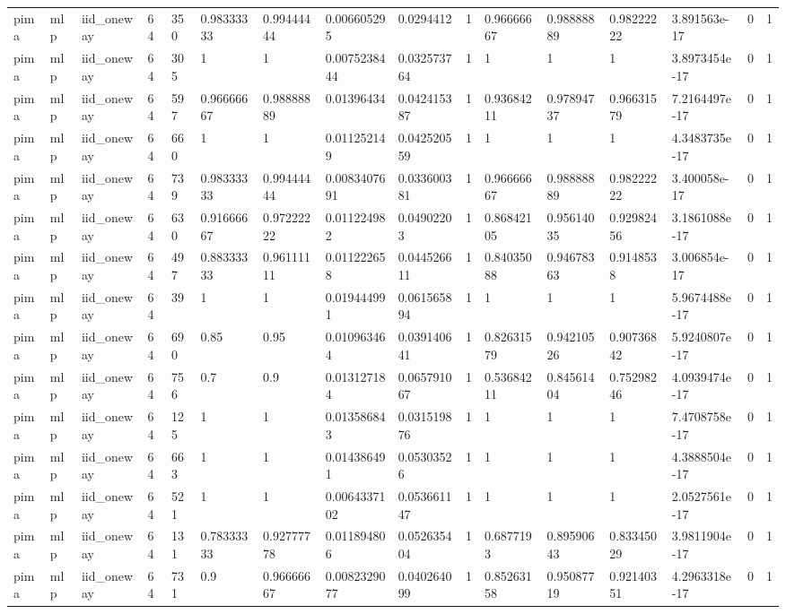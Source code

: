 \begin{tabular}{llllllllllllllll}
pima & mlp & iid\_oneway & 64 & 350 & 0.98333333 & 0.99444444 & 0.006605295 & 0.0294412 & 1 & 0.96666667 & 0.98888889 & 0.98222222 & 3.891563e-17 & 0 & 1 \\
pima & mlp & iid\_oneway & 64 & 305 & 1 & 1 & 0.0075238444 & 0.032573764 & 1 & 1 & 1 & 1 & 3.8973454e-17 & 0 & 1 \\
pima & mlp & iid\_oneway & 64 & 597 & 0.96666667 & 0.98888889 & 0.01396434 & 0.042415387 & 1 & 0.93684211 & 0.97894737 & 0.96631579 & 7.2164497e-17 & 0 & 1 \\
pima & mlp & iid\_oneway & 64 & 660 & 1 & 1 & 0.011252149 & 0.042520559 & 1 & 1 & 1 & 1 & 4.3483735e-17 & 0 & 1 \\
pima & mlp & iid\_oneway & 64 & 739 & 0.98333333 & 0.99444444 & 0.0083407691 & 0.033600381 & 1 & 0.96666667 & 0.98888889 & 0.98222222 & 3.400058e-17 & 0 & 1 \\
pima & mlp & iid\_oneway & 64 & 630 & 0.91666667 & 0.97222222 & 0.011224982 & 0.04902203 & 1 & 0.86842105 & 0.95614035 & 0.92982456 & 3.1861088e-17 & 0 & 1 \\
pima & mlp & iid\_oneway & 64 & 497 & 0.88333333 & 0.96111111 & 0.011222658 & 0.044526611 & 1 & 0.84035088 & 0.94678363 & 0.9148538 & 3.006854e-17 & 0 & 1 \\
pima & mlp & iid\_oneway & 64 & 39 & 1 & 1 & 0.019444991 & 0.061565894 & 1 & 1 & 1 & 1 & 5.9674488e-17 & 0 & 1 \\
pima & mlp & iid\_oneway & 64 & 690 & 0.85 & 0.95 & 0.010963464 & 0.039140641 & 1 & 0.82631579 & 0.94210526 & 0.90736842 & 5.9240807e-17 & 0 & 1 \\
pima & mlp & iid\_oneway & 64 & 756 & 0.7 & 0.9 & 0.013127184 & 0.065791067 & 1 & 0.53684211 & 0.84561404 & 0.75298246 & 4.0939474e-17 & 0 & 1 \\
pima & mlp & iid\_oneway & 64 & 125 & 1 & 1 & 0.013586843 & 0.031519876 & 1 & 1 & 1 & 1 & 7.4708758e-17 & 0 & 1 \\
pima & mlp & iid\_oneway & 64 & 663 & 1 & 1 & 0.014386491 & 0.05303526 & 1 & 1 & 1 & 1 & 4.3888504e-17 & 0 & 1 \\
pima & mlp & iid\_oneway & 64 & 521 & 1 & 1 & 0.0064337102 & 0.053661147 & 1 & 1 & 1 & 1 & 2.0527561e-17 & 0 & 1 \\
pima & mlp & iid\_oneway & 64 & 131 & 0.78333333 & 0.92777778 & 0.011894806 & 0.052635404 & 1 & 0.6877193 & 0.89590643 & 0.83345029 & 3.9811904e-17 & 0 & 1 \\
pima & mlp & iid\_oneway & 64 & 731 & 0.9 & 0.96666667 & 0.0082329077 & 0.040264099 & 1 & 0.85263158 & 0.95087719 & 0.92140351 & 4.2963318e-17 & 0 & 1 \\

\end{tabular}
